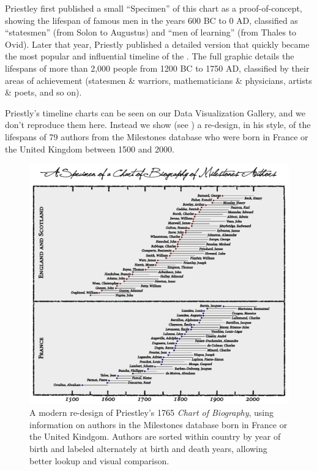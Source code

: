 Priestley first published a small ``Specimen'' of this chart as a proof-of-concept, showing the lifespan of famous men in the years 600 BC to 0 AD, classified as ``statesmen'' (from Solon to Augustus) and ``men of learning'' (from Thales to Ovid). Later that year, Priestly published a detailed version \citeyear{Priestley:1765} that quickly became the most popular and influential timeline of the .  The full graphic details the lifespans of more than 2,000 people from 1200 BC to 1750 AD, classified by their areas of achievement (statesmen \& warriors, mathematicians \& physicians, artists \& poets, and so on).

Priestly's timeline charts can be seen on our Data Visualization Gallery, and we don't reproduce them here.  Instead we show (see ) a re-design, in his style, of the lifespans of 79 authors from the Milestones database who were born in France or the United Kingdom between 1500 and 2000. 

\begin{figure}[!htb]
  \centering
  \includegraphics[width=.95\textwidth,clip]{fig/timespan}
  \caption{A modern re-design of Priestley's 1765 \emph{Chart of Biography}, using information on authors in the Milestones database born in France or the United Kindgom. Authors are sorted within country by year of birth and labeled alternately at birth and death years, allowing better lookup and visual comparison.}
  \label{fig:timespan}
\end{figure}

